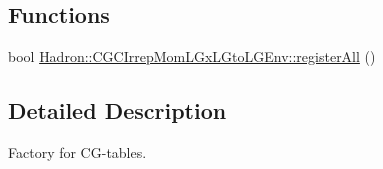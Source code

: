 \subsection*{Functions}
\begin{DoxyCompactItemize}
\item 
bool \mbox{\hyperlink{namespaceHadron_1_1CGCIrrepMomLGxLGtoLGEnv_ab765f2f3a5f090ad99642c37e973a15d}{Hadron\+::\+C\+G\+C\+Irrep\+Mom\+L\+Gx\+L\+Gto\+L\+G\+Env\+::register\+All}} ()
\end{DoxyCompactItemize}


\subsection{Detailed Description}
Factory for C\+G-\/tables. 

